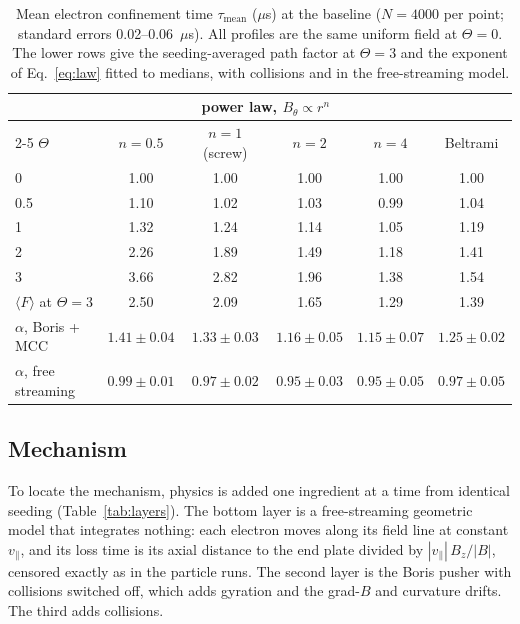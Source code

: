 \documentclass[11pt]{article}
\newcommand{\us}{\ensuremath{\mu}s}
\begin{document}
\begin{table}[htbp]
\centering
\caption{Mean electron confinement time $\tau_{\mathrm{mean}}$ (\us) at the baseline ($N = 4000$ per point; standard errors 0.02--0.06~\us). All profiles are the same uniform field at $\Theta = 0$. The lower rows give the seeding-averaged path factor at $\Theta = 3$ and the exponent of Eq.~\eqref{eq:law} fitted to medians, with collisions and in the free-streaming model.}
\label{tab:scan}
\begin{tabular}{lccccc}
\toprule
 & \multicolumn{4}{c}{power law, $B_\theta \propto r^n$} & \\
\cmidrule(lr){2-5}
$\Theta$ & $n = 0.5$ & $n = 1$ (screw) & $n = 2$ & $n = 4$ & Beltrami \\
\midrule
0   & 1.00 & 1.00 & 1.00 & 1.00 & 1.00 \\
0.5 & 1.10 & 1.02 & 1.03 & 0.99 & 1.04 \\
1   & 1.32 & 1.24 & 1.14 & 1.05 & 1.19 \\
2   & 2.26 & 1.89 & 1.49 & 1.18 & 1.41 \\
3   & 3.66 & 2.82 & 1.96 & 1.38 & 1.54 \\
\midrule
$\langle F\rangle$ at $\Theta = 3$ & 2.50 & 2.09 & 1.65 & 1.29 & 1.39 \\
$\alpha$, Boris + MCC & $1.41 \pm 0.04$ & $1.33 \pm 0.03$ & $1.16 \pm 0.05$ & $1.15 \pm 0.07$ & $1.25 \pm 0.02$ \\
$\alpha$, free streaming & $0.99 \pm 0.01$ & $0.97 \pm 0.02$ & $0.95 \pm 0.03$ & $0.95 \pm 0.05$ & $0.97 \pm 0.05$ \\
\bottomrule
\end{tabular}
\end{table}

\subsection{Mechanism}
\label{sec:mechanism}

To locate the mechanism, physics is added one ingredient at a time from identical seeding (Table~\ref{tab:layers}). The bottom layer is a free-streaming geometric model that integrates nothing: each electron moves along its field line at constant $v_\parallel$, and its loss time is its axial distance to the end plate divided by $|v_\parallel|\,B_z/|B|$, censored exactly as in the particle runs. The second layer is the Boris pusher with collisions switched off, which adds gyration and the grad-$B$ and curvature drifts. The third adds collisions.
\end{document}
